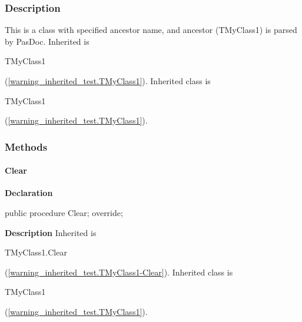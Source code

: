 \documentclass{report}
\newif\ifpdf
\begin{document}
\subsubsection*{\large{\textbf{Description}}\normalsize\hspace{1ex}\hfill}
This is a class with specified ancestor name, and ancestor (TMyClass1) is parsed by PasDoc. Inherited is \begin{ttfamily}TMyClass1\end{ttfamily}(\ref{warning_inherited_test.TMyClass1}). Inherited class is \begin{ttfamily}TMyClass1\end{ttfamily}(\ref{warning_inherited_test.TMyClass1}).\subsubsection*{\large{\textbf{Methods}}\normalsize\hspace{1ex}\hfill}
\paragraph*{Clear}\hspace*{\fill}

\label{warning_inherited_test.TMyClass2-Clear}
\begin{list}{}{
\setlength{\itemindent}{0cm}
\setlength{\listparindent}{0cm}
\setlength{\leftmargin}{\evensidemargin}
\addtolength{\leftmargin}{\tmplength}
\settowidth{\labelsep}{X}
\addtolength{\leftmargin}{\labelsep}
\setlength{\labelwidth}{\tmplength}
}
\item[\textbf{Declaration}\hfill]
\ifpdf
\begin{flushleft}
\fi
\begin{ttfamily}
public procedure Clear; override;\end{ttfamily}

\ifpdf
\end{flushleft}
\fi

\par
\item[\textbf{Description}]
Inherited is \begin{ttfamily}TMyClass1.Clear\end{ttfamily}(\ref{warning_inherited_test.TMyClass1-Clear}). Inherited class is \begin{ttfamily}TMyClass1\end{ttfamily}(\ref{warning_inherited_test.TMyClass1}).

\end{list}
\end{document}
